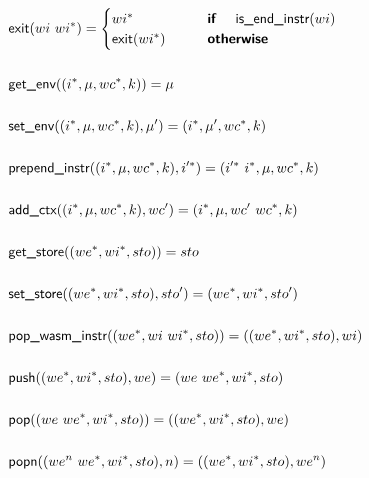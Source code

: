 \begin{align*}
  &\exit(wi ~ \seq{wi}) =
    \begin{cases}
      \seq{wi} &\quad\quad \premise{if}\quad ~ \isendinstr(wi) \\
      \exit(\seq{wi}) &\quad\quad \premise{otherwise} \\
    \end{cases}
  \\
%
\newline \\
  &\getenv((\seq i, \mu, wc^*, k)) = \mu \\
%
\newline \\
  &\setenv((\seq i, \mu, wc^*, k), \mu') = (\seq i, \mu', wc^*, k) \\
%
\newline \\
  &\prependinstr((\seq i, \mu, wc^*, k), \seq{i'}) = (\seq{i'} ~ \seq i, \mu, wc^*, k) \\
%
\newline \\
  &\addctx((\seq i, \mu, wc^*, k), wc') = (\seq i, \mu, wc' ~ wc^*, k) \\
%
\newline \\
  &\getstore((\seq{we}, \seq{wi}, sto)) = sto \\
%
\newline \\
  &\setstore((\seq{we}, \seq{wi}, sto), sto') = (\seq{we}, \seq{wi}, sto') \\
%
\newline \\
  &\popwasminstr((\seq{we}, wi ~ \seq{wi}, sto)) = ((\seq{we}, \seq{wi}, sto), wi) \\
%
\newline \\
  &\push((\seq{we}, \seq{wi}, sto), we) = (we ~ \seq{we}, \seq{wi}, sto) \\
%
\newline \\
  &\pop((we ~ \seq{we}, \seq{wi}, sto)) = ((\seq{we}, \seq{wi}, sto), we) \\
%
\newline \\
  &\popn((we^n ~ \seq{we}, \seq{wi}, sto), n) = ((\seq{we}, \seq{wi}, sto), we^n) \\
%
\newline \\

\end{align*}
